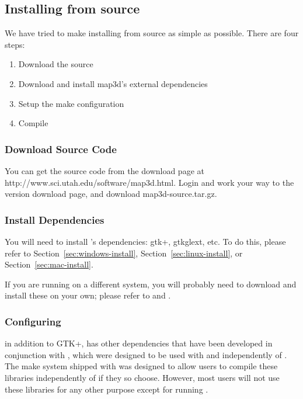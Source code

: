 \subsection{Installing from source}
\label{sec:source-install}

We have tried to make installing \map{} from source as simple as possible.  
There are four steps:


\begin{enumerate}
  \item Download the source
  \item Download and install map3d's external dependencies
  \item Setup the make configuration
  \item Compile
\end{enumerate}

\subsubsection{Download Source Code}
You can get the \map{} source code from the \map{} download page at 
{http://www.sci.utah.edu/software/map3d.html}.  Login and work your way
to the \map{} version \version{} download page, and download 
map3d-source.tar.gz.

\subsubsection{Install Dependencies}
You will need to install \map{}'s dependencies: gtk+, gtkglext, etc.  To do
this, please refer to Section~\ref{sec:windows-install},
Section~\ref{sec:linux-install}, or Section~\ref{sec:mac-install}.

If you are running on a different
system, you will probably need to download and install these on 
your own; please refer to 
and .

\subsubsection{Configuring \map{}}
\map{} in addition to GTK+, \map{} has other dependencies that have been
developed in conjunction with \map{}, which were designed to be used 
with and independently of \map{}.  The make system shipped with \map{}
was designed to allow users to compile these libraries independently
of \map{} if they so choose.  However, most users will not use
these libraries for any other purpose except for running \map{}.

